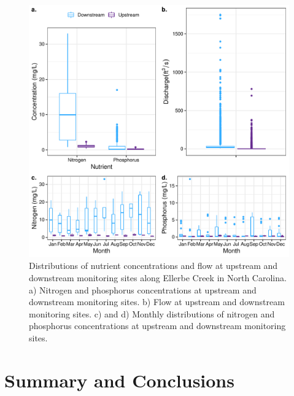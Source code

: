 \documentclass[12pt,]{article}
\begin{document}
\begin{figure}
\centering
\includegraphics{Landman_ENV872_Project_files/figure-latex/Data Analysis Figure 9-1.pdf}
\caption{Distributions of nutrient concentrations and flow at upstream
and downstream monitoring sites along Ellerbe Creek in North Carolina.
a) Nitrogen and phosphorus concentrations at upstream and downstream
monitoring sites. b) Flow at upstream and downstream monitoring sites.
c) and d) Monthly distributions of nitrogen and phosphorus
concentrations at upstream and downstream monitoring sites.}
\end{figure}

\newpage

\hypertarget{summary-and-conclusions}{%
\section{Summary and Conclusions}\label{summary-and-conclusions}}
\end{document}
